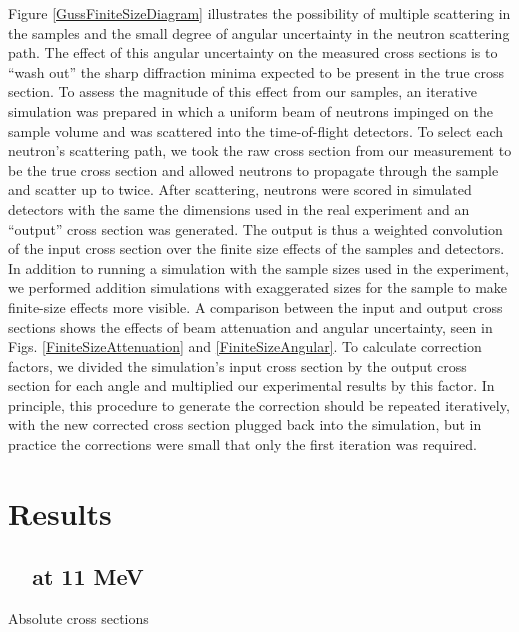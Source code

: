 Figure \ref{GussFiniteSizeDiagram} illustrates the possibility of multiple scattering in the samples
and the small degree of angular uncertainty in the neutron scattering path.
The effect of this angular uncertainty on the measured cross
sections is to ``wash out'' the sharp diffraction minima expected to be present in the true cross
section. To assess the magnitude of this effect from our
samples, an iterative simulation was prepared in which a uniform beam of neutrons
impinged on the sample volume and was scattered into the time-of-flight
detectors. To select each neutron's scattering path, we took the
raw cross section from our measurement to be the true cross section and allowed
neutrons to propagate through the sample and scatter up to twice. After
scattering, neutrons were scored in simulated detectors with the same the dimensions
used in the real experiment and an ``output'' cross section was generated. The
output is thus a weighted convolution of the input cross section
over the finite size effects of the samples and detectors. In addition to
running a simulation with the sample sizes used in the experiment, we performed
addition simulations with exaggerated sizes for the
sample to make finite-size effects more visible. A comparison between the input
and output cross sections shows the effects of beam attenuation and angular
uncertainty, seen in Figs. \ref{FiniteSizeAttenuation} and \ref{FiniteSizeAngular}.
To calculate correction factors, we divided the simulation's
input cross section by the output cross section for each angle and multiplied our
experimental results by this factor. In principle, this procedure to generate
the correction should be repeated iteratively, with the new corrected cross
section plugged back into the simulation, but in practice the corrections were small
that only the first iteration was required.

\section{Results}
\subsection{\snTwelveFour\ \el\ at 11 MeV}
Absolute cross sections 

